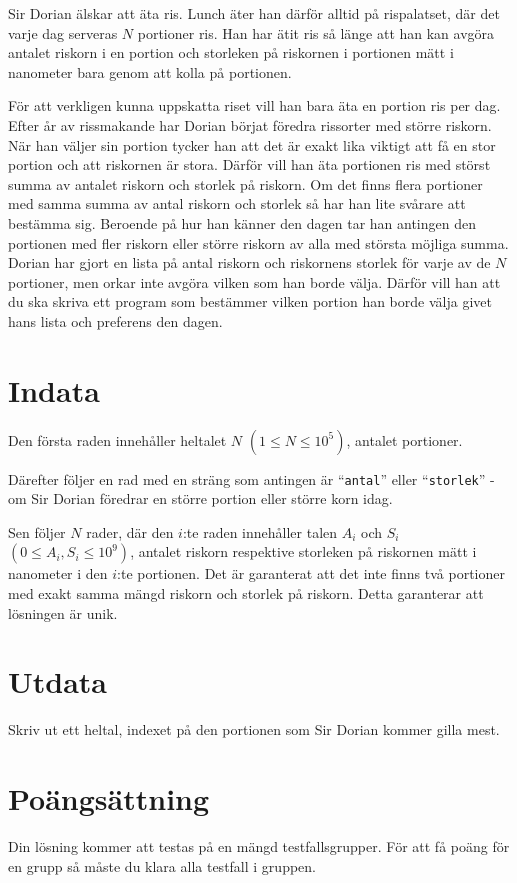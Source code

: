 \noindent
Sir Dorian älskar att äta ris. 
Lunch äter han därför alltid på rispalatset, där det varje dag serveras $N$ portioner ris.
Han har ätit ris så länge att han kan avgöra antalet riskorn i en portion och storleken på riskornen i portionen mätt i nanometer bara genom att kolla på portionen. 

\noindent
För att verkligen kunna uppskatta riset vill han bara äta en portion ris per dag. 
Efter år av rissmakande har Dorian börjat föredra rissorter med större riskorn. När han väljer sin portion tycker han att det är exakt lika viktigt att få en stor portion och att riskornen är stora.
Därför vill han äta portionen ris med störst summa av antalet riskorn och storlek på riskorn.
Om det finns flera portioner med samma summa av antal riskorn och storlek så har han lite svårare att bestämma sig.
Beroende på hur han känner den dagen tar han antingen den portionen med fler riskorn eller större riskorn av alla med största möjliga summa.
Dorian har gjort en lista på antal riskorn och riskornens storlek för varje av de $N$ portioner, men orkar inte avgöra vilken som han borde välja.
Därför vill han att du ska skriva ett program som bestämmer vilken portion han borde välja givet hans lista och preferens den dagen.

\section*{Indata}
\noindent
Den första raden innehåller heltalet $N$ $(1 \leq N \leq 10^5)$, antalet portioner.

\noindent
Därefter följer en rad med en sträng som antingen är ``\texttt{antal}'' eller ``\texttt{storlek}'' - om Sir Dorian föredrar en större portion eller större korn idag.

\noindent
Sen följer $N$ rader, där den $i$:te raden innehåller talen $A_i$ och $S_i$ $(0 \leq A_i, S_i \leq 10^9)$, antalet riskorn respektive storleken på riskornen mätt i nanometer i den $i$:te portionen.
Det är garanterat att det inte finns två portioner med exakt samma mängd riskorn och storlek på riskorn. Detta garanterar att lösningen är unik.

\section*{Utdata}
\noindent
Skriv ut ett heltal, indexet på den portionen som Sir Dorian kommer gilla mest.

\section*{Poängsättning}
\noindent
Din lösning kommer att testas på en mängd testfallsgrupper.
För att få poäng för en grupp så måste du klara alla testfall i gruppen.

